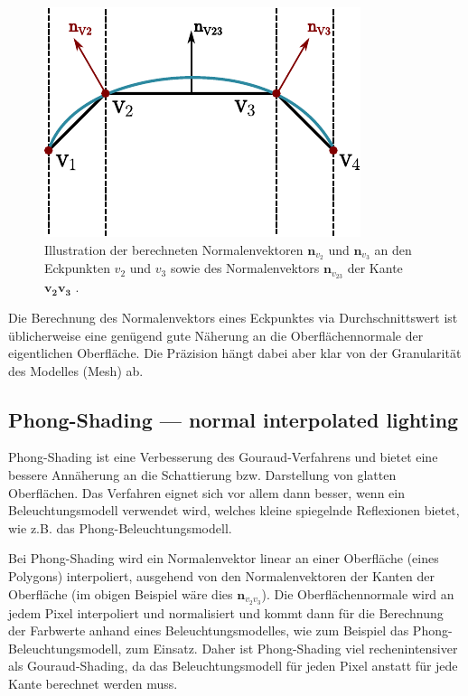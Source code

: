 \begin{figure}[H]
    \centering
    \includegraphics{img/shading_mesh_normals.pdf}
    \caption{Illustration der berechneten Normalenvektoren $\bm{n}_{v_{2}}$ und
    $\bm{n}_{v_{3}}$ an den Eckpunkten $v_{2}$ und $v_{3}$ sowie des
    Normalenvektors $\bm{n}_{v_{23}}$ der Kante $\bm{v_{2}v_{3}}$
    \protect\footnotemark.}\label{fig:gouraud_shading_normals_illustration}
\end{figure}

Die Berechnung des Normalenvektors eines Eckpunktes via Durchschnittswert ist
üblicherweise eine genügend gute Näherung an die Oberflächennormale der
eigentlichen Oberfläche. Die Präzision hängt dabei aber klar von der
Granularität des Modelles (Mesh) ab.

\subsection{Phong-Shading --- normal interpolated lighting}
\label{subsec:phong_shading}

Phong-Shading ist eine Verbesserung des Gouraud-Verfahrens und bietet eine
bessere Annäherung an die Schattierung bzw. Darstellung von glatten
Oberflächen. Das Verfahren eignet sich vor allem dann besser, wenn ein
Beleuchtungsmodell verwendet wird, welches kleine spiegelnde Reflexionen
bietet, wie z.B. das Phong-Beleuchtungsmodell.

Bei Phong-Shading wird ein Normalenvektor linear an einer Oberfläche
(eines Polygons) interpoliert, ausgehend von den Normalenvektoren der
Kanten der Oberfläche (im obigen Beispiel wäre dies
$\bm{n}_{v_{2}v_{3}}$). Die Oberflächennormale wird an jedem Pixel
interpoliert und normalisiert und kommt dann für die Berechnung der
Farbwerte anhand eines Beleuchtungsmodelles, wie zum Beispiel das
Phong-Beleuchtungsmodell, zum Einsatz. Daher ist Phong-Shading viel
rechenintensiver als Gouraud-Shading, da das Beleuchtungsmodell für
jeden Pixel anstatt für jede Kante berechnet werden muss.

